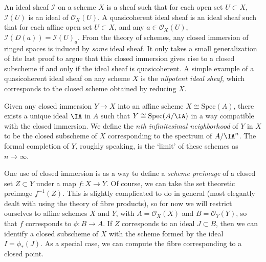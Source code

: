 \begin{remark}
    An ideal sheaf $\mathcal{I}$ on a scheme $X$ is a sheaf such that for each open set $U \subset X$, $\mathcal{I}(U)$ is an ideal of $\mathcal{O}_X(U)$. A quasicoherent ideal sheaf is an ideal sheaf such that for each affine open set $U \subset X$, and any $a \in \mathcal{O}_X(U)$, $\mathcal{I}(D(a)) = \mathcal{I}(U)_a$. From the theory of schemes, any closed immersion of ringed spaces is induced by \emph{some} ideal sheaf. It only takes a small generalization of hte last proof to argue that this closed immersion gives rise to a closed subscheme if and only if the ideal sheaf is quasicoherent. A simple example of a quasicoherent ideal sheaf on any scheme $X$ is the \emph{nilpotent ideal sheaf}, which corresponds to the closed scheme obtained by reducing $X$.
\end{remark}

\begin{example}
    Given any closed immersion $Y \to X$ into an affine scheme $X \cong \text{Spec}(A)$, there exists a unique ideal $\IA$ in $A$ such that $Y \cong \text{Spec}(A/\IA)$ in a way compatible with the closed immersion. We define the \emph{$n$th infinitesimal neighborhood} of $Y$ in $X$ to be the closed subscheme of $X$ corresponding to the spectrum of $A/\IA^n$. The formal completion of $Y$, roughly speaking, is the `limit' of these schemes as $n \to \infty$.
\end{example}

One use of closed immersion is as a way to define a \emph{scheme preimage} of a closed set $Z \subset Y$ under a map $f: X \to Y$. Of course, we can take the set theoretic preimage $f^{-1}(Z)$. This is slightly complicated to do in general (most elegantly dealt with using the theory of fibre products), so for now we will restrict ourselves to affine schemes $X$ and $Y$, with $A = \mathcal{O}_X(X)$ and $B = \mathcal{O}_Y(Y)$, so that $f$ corresponds to $\phi: B \to A$. If $Z$ corresponds to an ideal $J \subset B$, then we can identify a closed subscheme of $X$ with the scheme formed by the ideal $I = \phi_*(J)$. As a special case, we can compute the fibre corresponding to a closed point.

